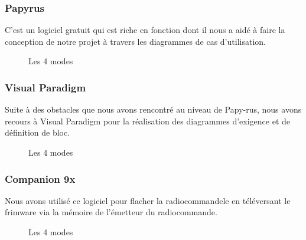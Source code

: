 	\subsubsection{Papyrus}
	C'est un logiciel gratuit qui est riche en fonction dont il nous a aidé à faire la conception de notre projet à travers les diagrammes de cas d'utilisation.
	\begin{figure}[h]
		\begin{center}
			\centering
		\end{center}
		\caption{Les 4 modes}
	\end{figure}
	\newpage
	\subsubsection{Visual Paradigm}
	Suite à des obstacles que nous avons rencontré au niveau de Papy-rus, nous avons recours à Visual Paradigm pour la réalisation des diagrammes d'exigence et de définition de bloc.
	\begin{figure}[h]
		\begin{center}
			\centering
		\end{center}
		\caption{Les 4 modes}
	\end{figure}
	\subsubsection{Companion 9x}
	Nous avons utilisé ce logiciel pour flacher la radiocommandele en téléversant le frimware via la mémoire de l'émetteur du radiocommande.
	\begin{figure}[h]
		\begin{center}
			\centering
		\end{center}
		\caption{Les 4 modes}
	\end{figure}
	\newpage
